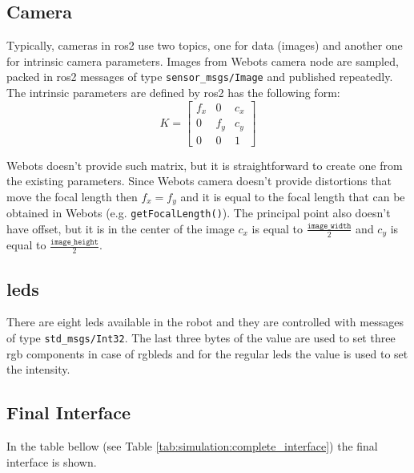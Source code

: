 \subsection{Camera}
Typically, cameras in \ac{ros2} use two topics, one for data (images) and another one for intrinsic camera parameters.
Images from Webots camera node are sampled, packed in \ac{ros2} messages of type \texttt{sensor\_msgs/Image} and published repeatedly.
The intrinsic parameters are defined by \ac{ros2} has the following form:
\begin{equation}
K = \begin{bmatrix}
    f_x & 0 & c_x \\
    0 & f_y & c_y \\
    0 & 0 & 1
\end{bmatrix}
\end{equation}

Webots doesn't provide such matrix, but it is straightforward to create one from the existing parameters.
Since Webots camera doesn't provide distortions that move the focal length then $f_x = f_y$ and it is equal to the focal length that can be obtained in Webots (e.g. \texttt{getFocalLength()}).
The principal point also doesn't have offset, but it is in the center of the image $c_x$ is equal to $ \frac{\texttt{image\_width}}{2} $ and $c_y$ is equal to $ \frac{\texttt{image\_height}}{2} $.

\subsection{\acsp{led}}
There are eight \acsp{led} available in the robot and they are controlled with messages of type \texttt{std\_msgs/Int32}.
The last three bytes of the value are used to set three \ac{rgb} components in case of \acsp{rgbled} and for the regular \acp{led} the value is used to set the intensity.

\subsection{Final Interface}

In the table bellow (see Table \ref{tab:simulation:complete_interface}) the final interface is shown.


